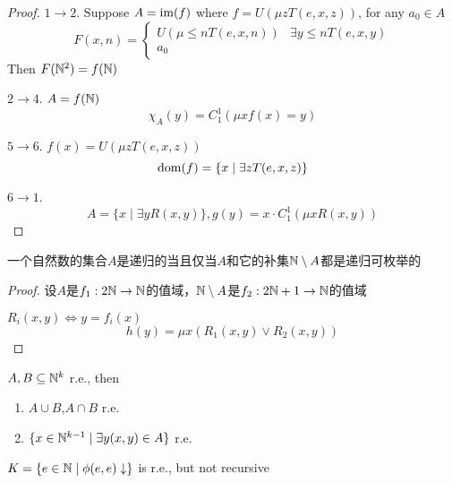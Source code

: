 \documentclass[11pt]{article}
\begin{document}
\begin{proof}
\(1\to 2\). Suppose \(A=\operatorname{im}(f)\) where \(f=U(\mu zT(e,x,z))\), for any \(a_0\in A\)
\begin{equation*}
F(x,n)=
\begin{cases}
U(\mu\le nT(e,x,n))&\exists y\le nT(e,x,y)\\
a_0
\end{cases}
\end{equation*}
Then \(F(\mathbb{N}^2)=f(\mathbb{N})\)

\(2\to 4\). \(A=f(\mathbb{N})\)
\begin{equation*}
\chi_A(y)=C_1^1(\mu xf(x)=y)
\end{equation*}

\(5\to 6\). \(f(x)=U(\mu zT(e,x,z))\)
\begin{equation*}
\operatorname{dom}(f)=\{x\mid\exists zT(e,x,z)\}
\end{equation*}

\(6\to 1\).
\begin{equation*}
A=\{x\mid\exists yR(x,y)\},g(y)=x\cdot C_1^1(\mu xR(x,y))
\end{equation*}
\end{proof}

\begin{theorem}[]
一个自然数的集合\(A\)是递归的当且仅当\(A\)和它的补集\(\mathbb{N}\setminus A\)都是递归可枚举的
\end{theorem}

\begin{proof}
设\(A\)是\(f_1:2\mathbb{N}\to\mathbb{N}\)的值域，\(\mathbb{N}\setminus A\)是\(f_2:2\mathbb{N}+1\to\mathbb{N}\)的值域

\(R_i(x,y)\Leftrightarrow y=f_i(x)\)
\begin{equation*}
h(y)=\mu x(R_1(x,y)\vee R_2(x,y))
\end{equation*}
\end{proof}

\begin{definition}[]
\(A,B\subseteq\mathbb{N}^k\) r.e., then
\begin{enumerate}
\item \(A\cup B\),\(A\cap B\) r.e.
\item \(\{x\in\mathbb{N}^{k-1}\mid\exists y(x,y)\in A\}\) r.e.
\end{enumerate}
\end{definition}

\begin{theorem}[]
\(K=\{e\in\mathbb{N}\mid\phi(e,e)\downarrow\}\) is r.e., but not recursive
\end{theorem}
\end{document}
